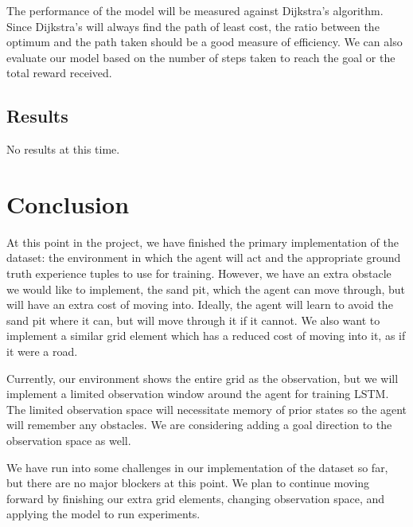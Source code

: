 \documentclass[sigplan,screen]{acmart}
\begin{document}
The performance of the model will be measured against Dijkstra's algorithm.
Since Dijkstra's will always find the path of least cost, the ratio between the
optimum and the path taken should be a good measure of efficiency. We can also
evaluate our model based on the number of steps taken to reach the goal or the
total reward received.

\subsection{Results}
No results at this time.

\section{Conclusion}
At this point in the project, we have finished the primary implementation of the
dataset: the environment in which the agent will act and the appropriate ground
truth experience tuples to use for training. However, we have an extra obstacle
we would like to implement, the sand pit, which the agent can move through, but
will have an extra cost of moving into. Ideally, the agent will learn to avoid
the sand pit where it can, but will move through it if it cannot. We also want
to implement a similar grid element which has a reduced cost of moving into it,
as if it were a road.

Currently, our environment shows the entire grid as the observation, but we will
implement a limited observation window around the agent for training LSTM. The
limited observation space will necessitate memory of prior states so the agent
will remember any obstacles. We are considering adding a goal direction to the
observation space as well.

We have run into some challenges in our implementation of the dataset so far,
but there are no major blockers at this point. We plan to continue moving
forward by finishing our extra grid elements, changing observation space, and
applying the model to run experiments.



\end{document}
